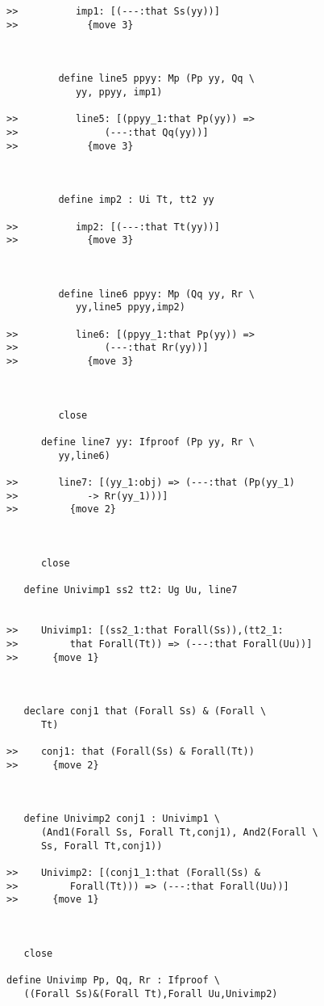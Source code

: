 \documentclass[12pt]{article}
\begin{document}
\begin{verbatim}
>>          imp1: [(---:that Ss(yy))]
>>            {move 3}



         define line5 ppyy: Mp (Pp yy, Qq \
            yy, ppyy, imp1)

>>          line5: [(ppyy_1:that Pp(yy)) =>
>>               (---:that Qq(yy))]
>>            {move 3}



         define imp2 : Ui Tt, tt2 yy

>>          imp2: [(---:that Tt(yy))]
>>            {move 3}



         define line6 ppyy: Mp (Qq yy, Rr \
            yy,line5 ppyy,imp2)

>>          line6: [(ppyy_1:that Pp(yy)) =>
>>               (---:that Rr(yy))]
>>            {move 3}



         close

      define line7 yy: Ifproof (Pp yy, Rr \
         yy,line6)

>>       line7: [(yy_1:obj) => (---:that (Pp(yy_1)
>>            -> Rr(yy_1)))]
>>         {move 2}



      close

   define Univimp1 ss2 tt2: Ug Uu, line7


>>    Univimp1: [(ss2_1:that Forall(Ss)),(tt2_1:
>>         that Forall(Tt)) => (---:that Forall(Uu))]
>>      {move 1}



   declare conj1 that (Forall Ss) & (Forall \
      Tt)

>>    conj1: that (Forall(Ss) & Forall(Tt))
>>      {move 2}



   define Univimp2 conj1 : Univimp1 \
      (And1(Forall Ss, Forall Tt,conj1), And2(Forall \
      Ss, Forall Tt,conj1))

>>    Univimp2: [(conj1_1:that (Forall(Ss) &
>>         Forall(Tt))) => (---:that Forall(Uu))]
>>      {move 1}



   close

define Univimp Pp, Qq, Rr : Ifproof \
   ((Forall Ss)&(Forall Tt),Forall Uu,Univimp2)



\end{verbatim}
\end{document}
